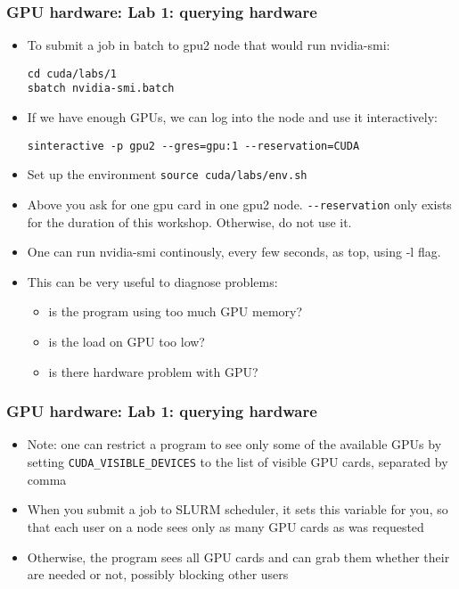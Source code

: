\begin{frame}[fragile]
  \frametitle{GPU hardware: Lab 1: querying hardware}
\begin{itemize}
\item To submit a job in batch to gpu2 node that would run {\color{mycolorcli}nvidia-smi}:
{\color{mycolorcli}
\begin{verbatim}
cd cuda/labs/1
sbatch nvidia-smi.batch
\end{verbatim}
}
\item If we have enough GPUs, we can log into the node and use it interactively:
{\color{mycolorcli}
\begin{verbatim}
sinteractive -p gpu2 --gres=gpu:1 --reservation=CUDA
\end{verbatim}
}
\item Set up the environment {\color{mycolorcli}\verb|source cuda/labs/env.sh|} 
\item Above you ask for one gpu card in one gpu2 node. {\color{mycolorcli}\verb|--reservation|} only exists for the duration
  of this workshop. Otherwise, do not use it.

\item One can run {\color{mycolorcli}nvidia-smi} continously, every few seconds, as {\color{mycolorcli}top}, using {\color{mycolorcli}-l} flag. 
\item This can be very useful to diagnose problems: 
  \begin{itemize}
  \item is the program using too much GPU memory?
  \item is the load on GPU too low? 
  \item is there hardware problem with GPU?
  \end{itemize}
\end{itemize}
\end{frame}

\begin{frame}[fragile]
  \frametitle{GPU hardware: Lab 1: querying hardware}
\begin{itemize}
\item Note: one can restrict a program to see only some of the available GPUs by setting 
{\color{mycolorcli}\verb|CUDA_VISIBLE_DEVICES|} to the list of visible GPU cards, separated by comma
\item When you submit a job to SLURM scheduler, it sets this variable for you, so that each user on a node sees only as many GPU cards as was requested
\item Otherwise, the program sees all GPU cards and can grab them whether their are needed or not, possibly blocking other users
\end{itemize}
\end{frame}


